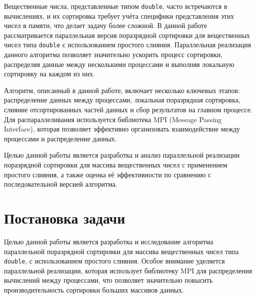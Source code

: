 \documentclass[12pt]{article}
\begin{document}
	Вещественные числа, представленные типом \texttt{double}, часто встречаются в вычислениях, и их сортировка требует учёта специфики представления этих чисел в памяти, что делает задачу более сложной. В данной работе рассматривается параллельная версия поразрядной сортировки для вещественных чисел типа \texttt{double} с использованием простого слияния. Параллельная реализация данного алгоритма позволяет значительно ускорить процесс сортировки, распределяя данные между несколькими процессами и выполняя локальную сортировку на каждом из них.
	
	Алгоритм, описанный в данной работе, включает несколько ключевых этапов: распределение данных между процессами, локальная поразрядная сортировка, слияние отсортированных частей данных и сбор результатов на главном процессе. Для распараллеливания используется библиотека MPI (Message Passing Interface), которая позволяет эффективно организовать взаимодействие между процессами и распределение данных.
	
	Целью данной работы является разработка и анализ параллельной реализации поразрядной сортировки для массива вещественных чисел с применением простого слияния, а также оценка её эффективности по сравнению с последовательной версией алгоритма.
	
	\newpage
	
	\section*{Постановка задачи} 
	
	\hspace*{1.25em}Целью данной работы является разработка и исследование алгоритма параллельной поразрядной сортировки для массива вещественных чисел типа \texttt{double}, с использованием простого слияния. Особое внимание уделяется параллельной реализации, которая использует библиотеку MPI для распределения вычислений между процессами, что позволяет значительно повысить производительность сортировки больших массивов данных.
	
\end{document}
